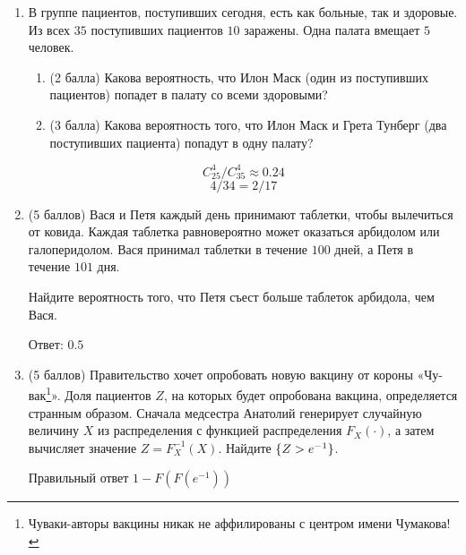 \documentclass[12pt]{article}
\let\P\relax
\DeclareMathOperator{\P}{\mathbb{P}}
\newenvironment{solution}{}{}
\begin{document}
\begin{enumerate}
    
    \item В группе пациентов, поступивших сегодня, есть как больные, так 
и здоровые. Из всех $35$ поступивших пациентов $10$ заражены. Одна палата вмещает $5$ человек. 

    \begin{enumerate}
    \item (2 балла) Какова вероятность, что Илон Маск (один из поступивших пациентов) попадет в палату со всеми здоровыми?    
    
    \item (3 балла) Какова вероятность того, что Илон Маск и Грета Тунберг (два поступивших пациента) попадут в одну палату?
   \end{enumerate}
    
\begin{solution}
    \[
    C_{25}^4/C_{35}^4 \approx 0.24
    \]
    \[
    4/34=2/17
    \]
\end{solution}
    
    
    \item (5 баллов) Вася и Петя каждый день принимают таблетки, чтобы вылечиться от ковида. Каждая таблетка равновероятно может оказаться арбидолом или галоперидолом. Вася принимал таблетки в течение $100$ дней, а Петя в течение $101$ дня. 
    
    Найдите вероятность того, что Петя съест больше таблеток арбидола, чем Вася. 

\begin{solution}
Ответ: $0.5$
\end{solution}    
    
    
    \item (5 баллов) Правительство хочет опробовать новую вакцину от короны «Чу-вак\footnote{Чуваки-авторы вакцины никак не аффилированы с центром имени Чумакова!}». Доля пациентов $Z$, на которых будет опробована вакцина, определяется странным образом. Сначала медсестра Анатолий генерирует случайную величину $X$ из распределения с функцией распределения $F_X(\cdot)$, а затем вычисляет значение $Z=F^{-1}_X(X)$. Найдите $\P\{Z > e^{-1}\}$.
    
\begin{solution}

Правильный ответ $1-F(F(e^{-1}))$
\end{solution}
    

\end{enumerate}
\end{document}
